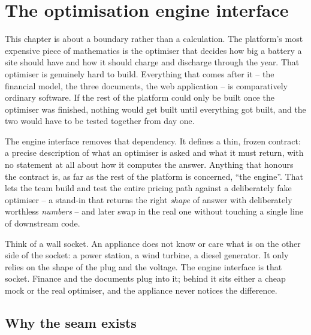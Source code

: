 \chapter{The optimisation engine interface}
\label{ch:engine}


This chapter is about a boundary rather than a calculation. The platform's most expensive piece of mathematics is the optimiser that decides how big a battery a site should have and how it should charge and discharge through the year. That optimiser is genuinely hard to build. Everything that comes after it -- the financial model, the three documents, the web application -- is comparatively ordinary software. If the rest of the platform could only be built once the optimiser was finished, nothing would get built until everything got built, and the two would have to be tested together from day one.

The engine interface removes that dependency. It defines a thin, frozen contract: a precise description of what an optimiser is asked and what it must return, with no statement at all about how it computes the answer. Anything that honours the contract is, as far as the rest of the platform is concerned, ``the engine''. That lets the team build and test the entire pricing path against a deliberately fake optimiser -- a stand-in that returns the right \emph{shape} of answer with deliberately worthless \emph{numbers} -- and later swap in the real one without touching a single line of downstream code.

\begin{plainnote}
Think of a wall socket. An appliance does not know or care what is on the other side of the socket: a power station, a wind turbine, a diesel generator. It only relies on the shape of the plug and the voltage. The engine interface is that socket. Finance and the documents plug into it; behind it sits either a cheap mock or the real optimiser, and the appliance never notices the difference.
\end{plainnote}


\section{Why the seam exists}

